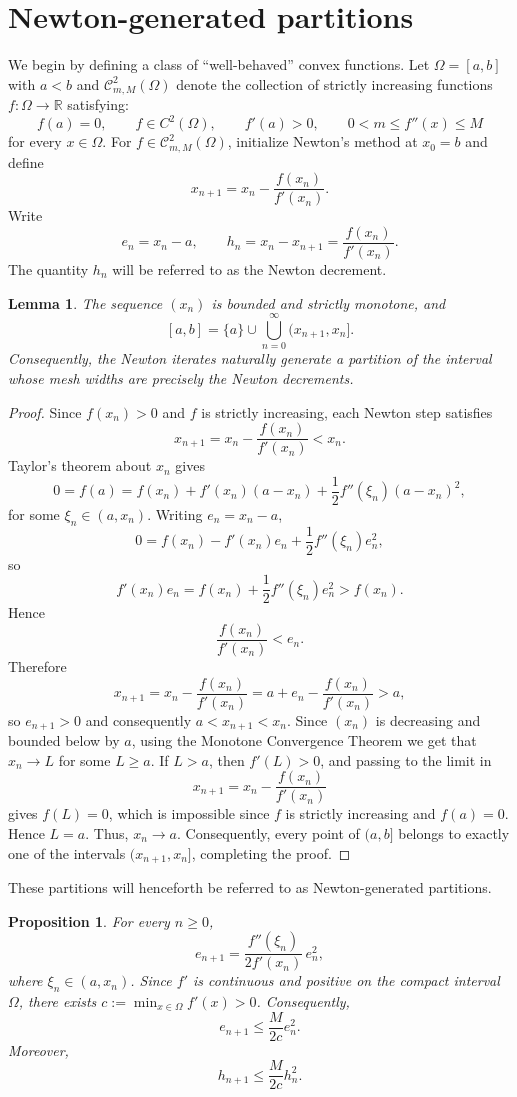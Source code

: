 \documentclass[psamsfonts,reqno]{amsart}
\theoremstyle{plain}
\newtheorem{lemma}[theorem]{Lemma}
\newtheorem{proposition}[theorem]{Proposition}
\theoremstyle{definition}
\theoremstyle{remark}
\numberwithin{equation}{section}
\begin{document}
\section{Newton-generated partitions}
We begin by defining a class of ``well-behaved'' convex functions. Let $\Omega=[a,b]$ with $a<b$ and $\mathscr C^2_{m,M}(\Omega)$ denote the collection of strictly increasing functions
$f:\Omega\rightarrow\mathbb R$ satisfying:
\[
f(a)=0,\qquad
f\in C^2(\Omega),\qquad
f'(a)>0,\qquad
0<m\le f''(x)\le M
\]
for every $x\in \Omega$. For $f\in\mathscr C^2_{m,M}(\Omega)$, initialize Newton's method at $x_0=b$ and
define
\[
x_{n+1}=x_n-\frac{f(x_n)}{f'(x_n)}.
\]
Write
\[
e_n=x_n-a,\qquad
h_n=x_n-x_{n+1}
      =\frac{f(x_n)}{f'(x_n)}.
\]
The quantity $h_n$ will be referred to as the Newton decrement.
\begin{lemma}\label{lem:partition}
The sequence $(x_n)$ is bounded and strictly monotone, and
\[
[a,b]=\{a\}\cup\bigcup_{n=0}^{\infty}(x_{n+1},x_n].
\]
Consequently, the Newton iterates naturally generate a partition of the interval whose mesh widths are precisely the Newton decrements.
\end{lemma}

\begin{proof}
Since $f(x_n)>0$ and $f$ is strictly increasing, each Newton step satisfies
\[
x_{n+1}=x_n-\frac{f(x_n)}{f'(x_n)}<x_n.
\]
Taylor's theorem about $x_n$ gives
\[
0=f(a)=f(x_n)+f'(x_n)(a-x_n)
+\frac12f''(\xi_n)(a-x_n)^2,
\]
for some $\xi_n\in(a,x_n)$. Writing $e_n=x_n-a$,
\[
0=f(x_n)-f'(x_n)e_n+\frac12f''(\xi_n)e_n^2,
\]
so
\[
f'(x_n)e_n
=f(x_n)+\frac12f''(\xi_n)e_n^2>f(x_n).
\]
Hence
\[
\frac{f(x_n)}{f'(x_n)}<e_n.
\]
Therefore
\[
x_{n+1}
=x_n-\frac{f(x_n)}{f'(x_n)}
=a+e_n-\frac{f(x_n)}{f'(x_n)}>a,
\]
so $e_{n+1}>0$ and consequently $a<x_{n+1}<x_n$. Since $(x_n)$ is decreasing and bounded below by $a$, using the Monotone Convergence Theorem we get that $x_n\to L$ for some $L\ge a$. If $L>a$, then $f'(L)>0$, and passing to the limit in
\[
x_{n+1}=x_n-\frac{f(x_n)}{f'(x_n)}
\]
gives $f(L)=0$, which is impossible since $f$ is strictly increasing and $f(a)=0$. Hence $L=a$. Thus, $x_n\to a$. Consequently, every point of $(a,b]$ belongs to exactly one of the intervals $(x_{n+1},x_n]$, completing the proof.
\end{proof}
These partitions will henceforth be referred to as Newton-generated partitions.
\pagebreak
\begin{proposition}\label{prop: 2,1}
For every $n\ge0$,
\[
e_{n+1}
=\frac{f''(\xi_n)}{2f'(x_n)}\,e_n^2,
\]
where $\xi_n\in(a,x_n)$. Since $f'$ is continuous and positive on the compact interval $\Omega$, there exists $c:=\min_{x\in\Omega}f'(x)>0$. Consequently,
\[
e_{n+1}\le\frac{M}{2c}e_n^2.
\]
Moreover,
\[
h_{n+1}\le\frac{M}{2c}h_n^2.
\]
\end{proposition}
\end{document}
